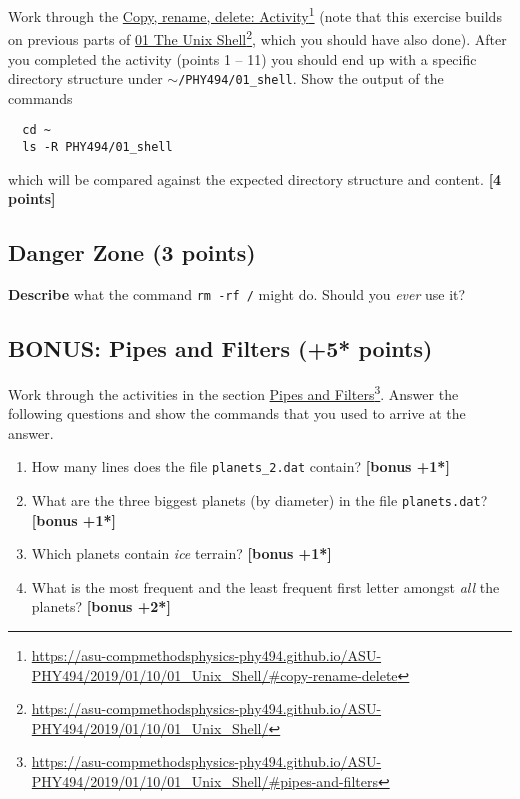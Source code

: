 \documentclass[letterpaper]{scrartcl}
\newcommand{\bonus}[1]{\textbf{[bonus +#1*]}}
\newcommand{\points}[1]{\textbf{[#1 points]}}
\newenvironment{enuma}{\begin{enumerate}[label=(\alph*)]}{\end{enumerate}}
\newcommand{\fnhref}[2]{\href{#1}{#2}\footnote{\url{#1}}}
\begin{document}
Work through the
\fnhref{https://asu-compmethodsphysics-phy494.github.io/ASU-PHY494/2019/01/10/01_Unix_Shell/\#copy-rename-delete}{Copy,
  rename, delete: Activity} (note that this exercise builds on
previous parts of
\fnhref{https://asu-compmethodsphysics-phy494.github.io/ASU-PHY494/2019/01/10/01_Unix_Shell/}{01
  The Unix Shell}, which you should have also done). After you
completed the activity (points 1 -- 11) you should end up with a
specific directory structure under
\texttt{$\sim$/PHY494/01\_shell}. Show the output of the commands
\begin{lstlisting}
  cd ~
  ls -R PHY494/01_shell
\end{lstlisting}
which will be compared against the expected directory structure and
content. \points{4}

\subsection{Danger Zone (3 points)}

\begin{center}
\end{center}
\textbf{Describe} what the command \texttt{rm -rf /} might do. Should
you \emph{ever} use it?

\subsection{BONUS: Pipes and Filters (+5* points)}
\label{sec:pipesandfilters}

Work through the activities in the section
\fnhref{https://asu-compmethodsphysics-phy494.github.io/ASU-PHY494/2019/01/10/01_Unix_Shell/\#pipes-and-filters}{Pipes
  and Filters}. Answer the following questions and show the commands
that you used to arrive at the answer.

\begin{enuma}
\item How many lines does the file \texttt{planets\_2.dat} contain? \bonus{1}
\item What are the three biggest planets (by diameter) in the file
  \texttt{planets.dat}? \bonus{1}
\item Which planets contain \emph{ice} terrain? \bonus{1}
\item \label{li:characters} What is the most frequent and the least
  frequent first letter amongst \emph{all} the planets? \bonus{2}
\end{enuma}
\end{document}
